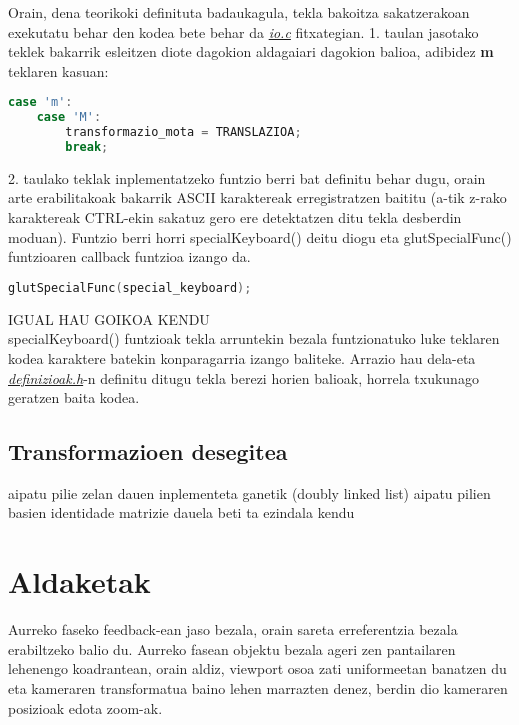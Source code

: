 \documentclass[12pt]{article}
\newcommand{\fitxategi}[1] {\underline{\textit{#1}}}
\begin{document}
Orain, dena teorikoki definituta badaukagula, tekla bakoitza sakatzerakoan exekutatu behar den kodea bete behar da \fitxategi{io.c} fitxategian. 1. taulan jasotako teklek bakarrik esleitzen diote dagokion aldagaiari dagokion balioa, adibidez \textbf{m} teklaren kasuan:

\begin{center}
	\begin{lstlisting}[language=C, basicstyle=\footnotesize]
	case 'm':
	case 'M':
		transformazio_mota = TRANSLAZIOA;
		break;
	\end{lstlisting}
\end{center}


2. taulako teklak inplementatzeko funtzio berri bat definitu behar dugu, orain arte erabilitakoak bakarrik ASCII karaktereak erregistratzen baititu (a-tik z-rako karaktereak CTRL-ekin sakatuz gero ere detektatzen ditu tekla desberdin moduan).
Funtzio berri horri specialKeyboard() deitu diogu eta glutSpecialFunc()\cite{glutSpecialFunc} funtzioaren callback funtzioa\cite{callback} izango da.

\begin{center}
	\begin{lstlisting}[language=C, basicstyle=\footnotesize]
	glutSpecialFunc(special_keyboard);
	\end{lstlisting}
\end{center}

IGUAL HAU GOIKOA KENDU\\

specialKeyboard() funtzioak tekla arruntekin bezala funtzionatuko luke teklaren kodea karaktere batekin konparagarria izango baliteke. Arrazio hau dela-eta \fitxategi{definizioak.h}-n definitu ditugu tekla berezi horien balioak, horrela txukunago geratzen baita kodea.




\subsection{Transformazioen desegitea}\label{procedure}

aipatu pilie zelan dauen inplementeta ganetik (doubly linked list)
aipatu pilien basien identidade matrizie dauela beti ta ezindala kendu


\section{Aldaketak}

Aurreko faseko feedback-ean jaso bezala, orain sareta erreferentzia bezala erabiltzeko balio du. Aurreko fasean objektu bezala ageri zen pantailaren lehenengo koadrantean, orain aldiz, viewport\cite{viewport} osoa zati uniformeetan banatzen du eta kameraren transformatua baino lehen marrazten denez, berdin dio kameraren posizioak edota zoom-ak.
\end{document}
